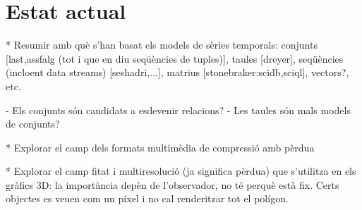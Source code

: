 













\section{Estat actual}

* Resumir amb què s'han basat els models de sèries temporals: conjunts [last,assfalg (tot i que en diu seqüències de tuples)], taules [dreyer], seqüències (incloent data streams) [seshadri,...], matrius [stonebraker:scidb,sciql],  vectors?, etc.
 
  - Els conjunts són candidats a esdevenir relacions?
  - Les taules són mals models de conjunts?



* Explorar el camp dels formats multimèdia de compressió amb pèrdua

* Explorar el camp fitat i multiresolució (ja significa pèrdua) que s'utilitza en els gràfics 3D: la importància depèn de l'observador, no té perquè està fix. Certs objectes es veuen com un píxel i no cal renderitzar tot el polígon.





